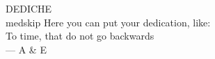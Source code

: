 \thispagestyle{empty}
{}

\vspace*{3cm}
\begin{center}
	DEDICHE \\medskip
    Here you can put your dedication, like: \\ \medskip
    To time, that do not go backwards \\ \medskip
    --- A \& E 
\end{center}